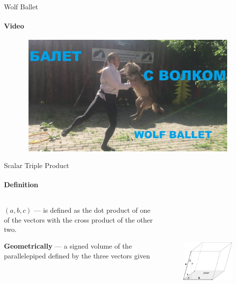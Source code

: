 \documentclass[aspectratio=169,notes]{beamer}
\begin{document}
\begin{frame}[t]{Wolf Ballet}
    \framesubtitle{Video}
    \vspace{-0.6cm}
    \begin{figure}[H]
        \href{https://youtu.be/6krfziMgucI}{
            \centering\includegraphics[height=6cm,width=1\textwidth,keepaspectratio]{wolf_video.jpg}}
        \label{fig:wolf_video.jpg}
    \end{figure}
\end{frame}

\begin{frame}[t]{Scalar Triple Product}
\framesubtitle{Definition}
    \begin{columns}[T,onlytextwidth]
        \begin{column}{0.65\textwidth}
            $(a,b,c)$ --- is defined as the dot product of one of the vectors with the cross product of the other two. \bigskip

            \textbf{Geometrically} --- a signed volume of the parallelepiped defined by the three vectors given
              
        \end{column}
        \begin{column}{0.38\textwidth}
            \begin{figure}[H]
                \centering\includegraphics[height=6cm,width=1\textwidth,keepaspectratio]{scalar_triple.png}
                \label{fig:scalar_triple.png}
            \end{figure}
        \end{column}
    \end{columns}
\end{frame}
\end{document}
